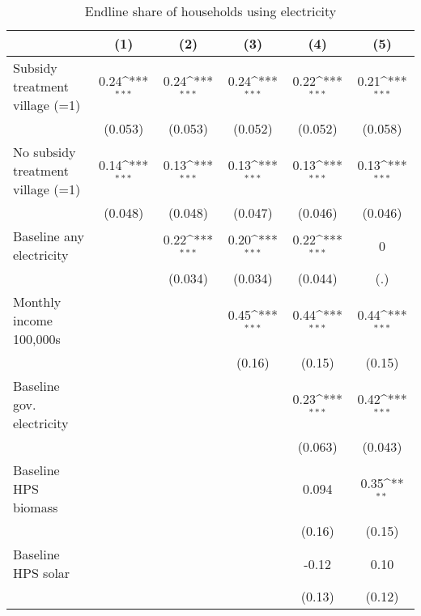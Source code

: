 \begin{table}[htbp]\centering
\def\sym#1{\ifmmode^{#1}\else\(^{#1}\)\fi}
\caption{Endline share of households using electricity}
\begin{tabular*}{1\hsize}{@{\hskip\tabcolsep\extracolsep\fill}l*{5}{c}}
\toprule
                &\multicolumn{1}{c}{(1)}         &\multicolumn{1}{c}{(2)}         &\multicolumn{1}{c}{(3)}         &\multicolumn{1}{c}{(4)}         &\multicolumn{1}{c}{(5)}         \\
\midrule
Subsidy treatment village (=1)&     0.24\sym{***}&     0.24\sym{***}&     0.24\sym{***}&     0.22\sym{***}&     0.21\sym{***}\\
                &  (0.053)         &  (0.053)         &  (0.052)         &  (0.052)         &  (0.058)         \\
No subsidy treatment village (=1)&     0.14\sym{***}&     0.13\sym{***}&     0.13\sym{***}&     0.13\sym{***}&     0.13\sym{***}\\
                &  (0.048)         &  (0.048)         &  (0.047)         &  (0.046)         &  (0.046)         \\
Baseline any electricity&                  &     0.22\sym{***}&     0.20\sym{***}&     0.22\sym{***}&        0         \\
                &                  &  (0.034)         &  (0.034)         &  (0.044)         &      (.)         \\
Monthly income 100,000s&                  &                  &     0.45\sym{***}&     0.44\sym{***}&     0.44\sym{***}\\
                &                  &                  &   (0.16)         &   (0.15)         &   (0.15)         \\
Baseline gov. electricity&                  &                  &                  &     0.23\sym{***}&     0.42\sym{***}\\
                &                  &                  &                  &  (0.063)         &  (0.043)         \\
Baseline HPS biomass&                  &                  &                  &    0.094         &     0.35\sym{**} \\
                &                  &                  &                  &   (0.16)         &   (0.15)         \\
Baseline HPS solar&                  &                  &                  &    -0.12         &     0.10         \\
                &                  &                  &                  &   (0.13)         &   (0.12)         \\

\end{tabular*}
\end{table}
